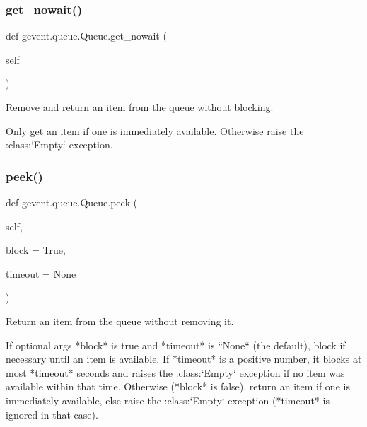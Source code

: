\subsubsection{\texorpdfstring{get\+\_\+nowait()}{get\_nowait()}}
{\footnotesize\ttfamily def gevent.\+queue.\+Queue.\+get\+\_\+nowait (\begin{DoxyParamCaption}\item[{}]{self }\end{DoxyParamCaption})}

\begin{DoxyVerb}Remove and return an item from the queue without blocking.

Only get an item if one is immediately available. Otherwise
raise the :class:`Empty` exception.
\end{DoxyVerb}
 \mbox{\label{classgevent_1_1queue_1_1_queue_a2591ab626ece2864d87f303ed58d967f}} 
\subsubsection{\texorpdfstring{peek()}{peek()}}
{\footnotesize\ttfamily def gevent.\+queue.\+Queue.\+peek (\begin{DoxyParamCaption}\item[{}]{self,  }\item[{}]{block = {\ttfamily True},  }\item[{}]{timeout = {\ttfamily None} }\end{DoxyParamCaption})}

\begin{DoxyVerb}Return an item from the queue without removing it.

If optional args *block* is true and *timeout* is ``None`` (the default),
block if necessary until an item is available. If *timeout* is a positive number,
it blocks at most *timeout* seconds and raises the :class:`Empty` exception
if no item was available within that time. Otherwise (*block* is false), return
an item if one is immediately available, else raise the :class:`Empty` exception
(*timeout* is ignored in that case).
\end{DoxyVerb}
 \mbox{\label{classgevent_1_1queue_1_1_queue_a90000a6a594083340c1123f84f4615ce}} 

